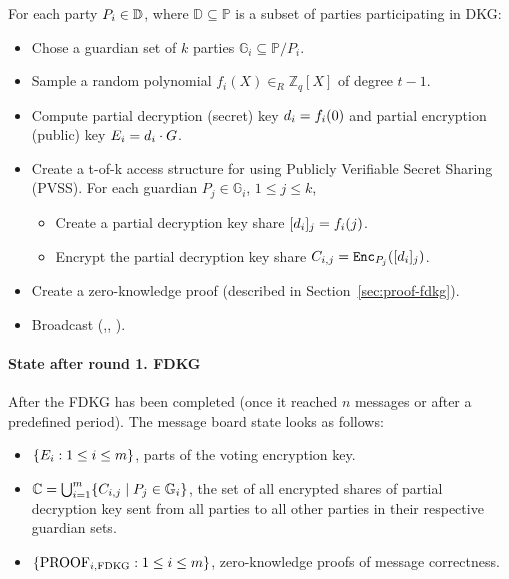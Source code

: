 \documentclass[runningheads]{llncs}
\begin{document}
For each party $P_{i} \in \mathbb{D}$, where $\mathbb{D} \subseteq  \mathbb{P}$ is a subset of parties participating in DKG:
\begin{itemize}
    \item Chose a guardian set of $k$ parties  $\mathbb{G}_i\subseteq \mathbb{P}/P_i$.
    \item Sample a random polynomial $f_{i}(X) \in_R \mathbb{Z}_q[X]$ of degree $t-1$.
    \item Compute partial decryption (secret) key $d_{i}= f_i(0)$ and partial encryption (public) key $E_{i} = d_{i} \cdot G$.
    \item Create a t-of-k access structure for  using Publicly Verifiable Secret Sharing (PVSS). For each guardian $P_{j} \in \mathbb{G}_i$, $1 \leq j \leq k$, \begin{itemize}
    \item Create a partial decryption key share $[d_{i}]_{j}=f_i(j)$.
    \item Encrypt the partial decryption key share $C_{i,j}=\texttt{Enc}_{P_{j}}([d_{i}]_{j})$.
    \end{itemize}
    
    \item Create a zero-knowledge proof (described in Section~\ref{sec:proof-fdkg}).
    \item Broadcast (,, ).
\end{itemize}

\paragraph*{State after round 1. FDKG}

After the FDKG has been completed (once it reached $n$ messages or after a predefined period). The message board state looks as follows:
\begin{itemize}
    \item $\{E_{i} : 1 \leq i \leq m\}$, parts of the voting encryption key.
    \item $\mathbb{C} = \bigcup_{i=1}^{m} \{C_{i,j} \mid P_j \in \mathbb{G}_i\}$, the set of all encrypted shares of partial decryption key sent from all parties to all other parties in their respective guardian sets.
    \item $\{\textrm{PROOF}_{i,\textrm{FDKG}} : 1 \leq i \leq m\}$, zero-knowledge proofs of message correctness.
\end{itemize}
\end{document}
